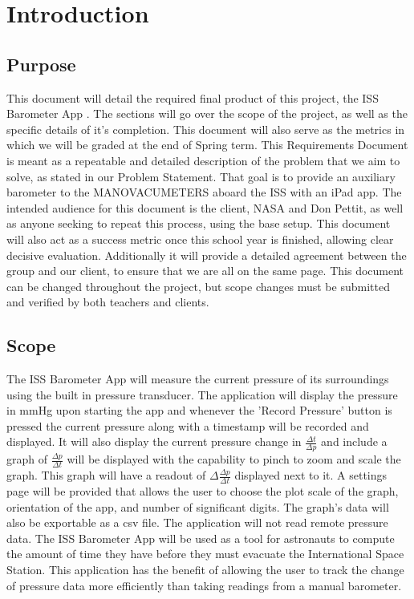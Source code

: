 \documentclass[onecolumn, draftclsnofoot,10pt, compsoc]{IEEEtran}
\def \CapstoneProjectName{ISS Barometer App }
\begin{document}
\section{Introduction}

\subsection{Purpose}
This document will detail the required final product of this project, the \CapstoneProjectName.
The sections will go over the scope of the project, as well as the specific details of it's completion.
This document will also serve as the metrics in which we will be graded at the end of Spring term.
This Requirements Document is meant as a repeatable and detailed description of the problem that we aim to solve, as stated in our Problem Statement.
That goal is to provide an auxiliary barometer to the MANOVACUMETERS aboard the ISS with an iPad app.
The intended audience for this document is the client, NASA and Don Pettit, as well as anyone seeking to repeat this process, using the base setup.
This document will also act as a success metric once this school year is finished, allowing clear decisive evaluation.
Additionally it will provide a detailed agreement between the group and our client, to ensure that we are all on the same page.
This document can be changed throughout the project, but scope changes must be submitted and verified by both teachers and clients.

\subsection{Scope}
The \CapstoneProjectName will measure the current pressure of its surroundings using the built in pressure transducer.
The application will display the pressure in mmHg upon starting the app and whenever the 'Record Pressure' button is pressed the current pressure along with a timestamp will be recorded and displayed.
It will also display the current pressure change in $\frac{\Delta t}{\Delta p}$ and include a graph of $\frac{\Delta p}{\Delta t}$ will be displayed with the capability to pinch to zoom and scale the graph.
This graph will have a readout of $\Delta \frac{\Delta p}{\Delta t}$ displayed next to it.\textbf{}
A settings page will be provided that allows the user to choose the plot scale of the graph, orientation of the app, and number of significant digits.
The graph's data will also be exportable as a csv file.
The application will not read remote pressure data.
The \CapstoneProjectName will be used as a tool for astronauts to compute the amount of time they have before they must evacuate the International Space Station.
This application has the benefit of allowing the user to track the change of pressure data more efficiently than taking readings from a manual barometer.
\end{document}
